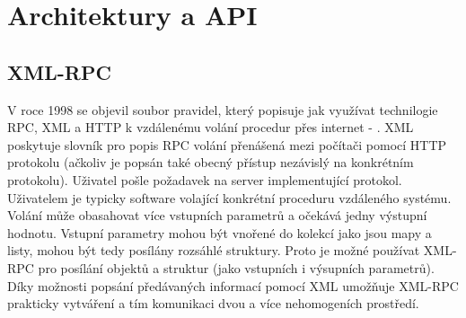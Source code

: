 \section{Architektury a API} %






\subsection{XML-RPC}
V roce 1998 se objevil soubor pravidel, který popisuje jak využívat technilogie RPC, XML a HTTP k vzdálenému volání procedur přes internet - .\cite{Winner99} XML poskytuje slovník pro popis RPC volání přenášená mezi počítači pomocí HTTP protokolu (ačkoliv je popsán také obecný přístup nezávislý na konkrétním protokolu). Uživatel pošle požadavek na server implementující protokol. Uživatelem je typicky software volající konkrétní proceduru vzdáleného systému. Volání může obasahovat více vstupních parametrů a očekává jedny výstupní hodnotu. Vstupní parametry mohou být vnořené do kolekcí jako jsou mapy a listy, mohou být tedy posílány rozsáhlé struktury. Proto je možné používat XML-RPC pro posílání objektů a struktur (jako vstupních i výsupních parametrů). Díky možnosti popsání předávaných informací pomocí XML umožňuje XML-RPC prakticky vytváření  a tím komunikaci dvou a více nehomogeních prostředí.\cite{Laurent01}  

